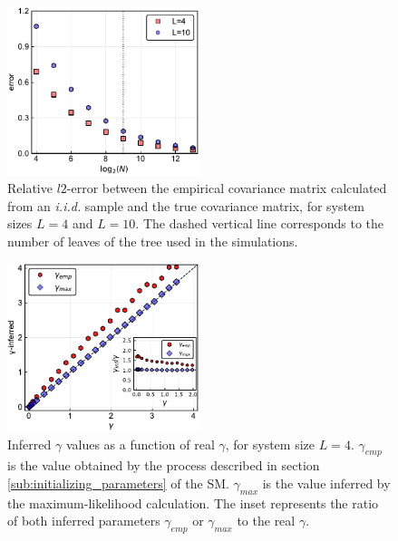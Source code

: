 \documentclass[preprint,amsmath,amssymb,superscriptaddress,showpacs,pre]{revtex4-1}
\begin{document}
\begin{figure}[!htb]
	\centering
	\includegraphics[keepaspectratio=true,width=0.5\textwidth]{Figures/error_Ciid_vs_numb_of_seq.pdf}
	\caption{Relative $l2$-error between the empirical covariance matrix calculated from an \emph{i.i.d.} sample and the true covariance matrix, for system sizes $L=4$ and $L=10$. The dashed vertical line corresponds to the number of leaves of the tree used in the simulations.}
	\label{fig:error_vs_nseqs}
\end{figure}

\begin{figure}[!htb]
	\centering
	\includegraphics[keepaspectratio=true,width=0.5\textwidth]{Figures/scatter_gamma_L4_100.pdf}
	\caption{Inferred $\gamma$ values as a function of real $\gamma$, for system size $L=4$. $\gamma_{emp}$ is the value obtained by the process described in section \ref{sub:initializing_parameters} of the SM. $\gamma_{max}$ is the value inferred by the maximum-likelihood calculation. 
	The inset represents the ratio of both inferred parameters $\gamma_{emp}$ or $\gamma_{max}$ to the real $\gamma$.}
	\label{fig:scatter_gamma_L4}
\end{figure}
\end{document}
